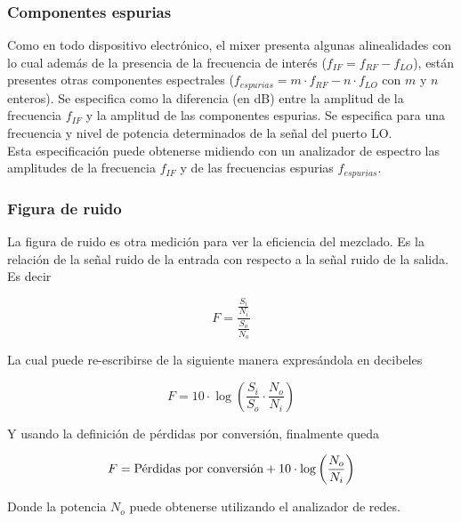 \documentclass[a4paper,10pt]{article}
\begin{document}
	\subsubsection{Componentes espurias}\label{todosputos}
	\indent Como en todo dispositivo electr\'onico, el mixer presenta algunas 
	alinealidades con lo cual adem\'as de la presencia de la frecuencia de 
	inter\'es ($f_{IF}=f_{RF}-f_{LO}$), est\'an presentes otras componentes 
	espectrales ($f_{espurias}=m\cdot f_{RF}-n\cdot f_{LO}$ con $m$ y $n$ 
	enteros). Se especifica como la diferencia (en dB) entre la amplitud de la 
	frecuencia $f_{IF}$ y la amplitud de las componentes espurias. Se especifica
	para una frecuencia y nivel de potencia determinados de la señal del puerto 
	LO. \\
	\indent Esta especificaci\'on puede obtenerse midiendo con un analizador de 
	espectro las amplitudes de la frecuencia $f_{IF}$ y de las frecuencias 
	espurias $f_{espurias}$.

	\subsubsection{Figura de ruido}
	\indent La figura de ruido es otra medición para ver la eficiencia del 
	mezclado. Es la relación de la señal ruido de la entrada con respecto a
	la señal ruido de la salida. Es decir
		
	$$F=\frac{\frac{S_i}{N_i}}{\frac{S_o}{N_o}}$$
	
	\indent La cual puede re-escribirse de la siguiente manera expres\'andola en
	decibeles 
		
	$$F=10\cdot\log\left(\frac{S_i}{S_o}\cdot\frac{N_o}{N_i}\right)$$
	
	\indent Y usando la definici\'on de p\'erdidas por conversi\'on, finalmente 
	queda
		
	$$F=\textmd{P\'erdidas por conversi\'on}+10\cdot\log\left(
	\frac{N_o}{N_i}\right)$$
		
	\indent Donde la potencia $N_o$ puede obtenerse utilizando el analizador de 
	redes.
		
\end{document}
